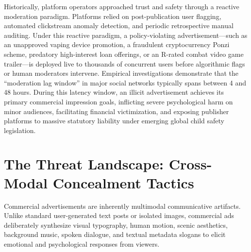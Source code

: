 \documentclass[12pt,a4paper]{report}
\begin{document}
Historically, platform operators approached trust and safety through a reactive moderation paradigm. Platforms relied on post-publication user flagging, automated clickstream anomaly detection, and periodic retrospective manual auditing. Under this reactive paradigm, a policy-violating advertisement---such as an unapproved vaping device promotion, a fraudulent cryptocurrency Ponzi scheme, predatory high-interest loan offerings, or an R-rated combat video game trailer---is deployed live to thousands of concurrent users before algorithmic flags or human moderators intervene. Empirical investigations demonstrate that the ``moderation lag window'' in major social networks typically spans between 4 and 48 hours. During this latency window, an illicit advertisement achieves its primary commercial impression goals, inflicting severe psychological harm on minor audiences, facilitating financial victimization, and exposing publisher platforms to massive statutory liability under emerging global child safety legislation.

\section{The Threat Landscape: Cross-Modal Concealment Tactics}

Commercial advertisements are inherently multimodal communicative artifacts. Unlike standard user-generated text posts or isolated images, commercial ads deliberately synthesize visual typography, human motion, scenic aesthetics, background music, spoken dialogue, and textual metadata slogans to elicit emotional and psychological responses from viewers.
\end{document}
